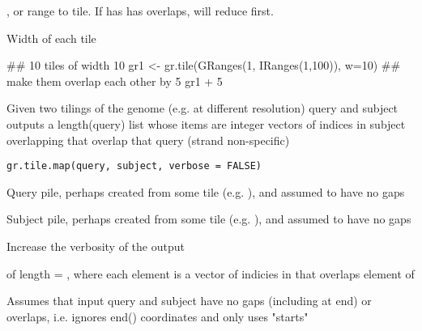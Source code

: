 \documentclass[a4paper]{book}
\begin{document}
%
\begin{Arguments}
\begin{ldescription}
\item[\code{gr}] ,  or  range to tile. If has  has overlaps, will reduce first.

\item[\code{w}] Width of each tile
\end{ldescription}
\end{Arguments}
%
\begin{Examples}
\begin{ExampleCode}
## 10 tiles of width 10
gr1 <- gr.tile(GRanges(1, IRanges(1,100)), w=10)
## make them overlap each other by 5
gr1 + 5
\end{ExampleCode}
\end{Examples}
%
\begin{Description}\relax
Given two tilings of the genome (e.g. at different resolution)
query and subject outputs a length(query) list whose items are integer vectors of indices in subject
overlapping that overlap that query (strand non-specific)
\end{Description}
%
\begin{Usage}
\begin{verbatim}
gr.tile.map(query, subject, verbose = FALSE)
\end{verbatim}
\end{Usage}
%
\begin{Arguments}
\begin{ldescription}
\item[\code{query}] Query  pile, perhaps created from some tile (e.g. ), and assumed to have no gaps

\item[\code{subject}] Subject  pile, perhaps created from some tile (e.g. ), and assumed to have no gaps

\item[\code{verbose}] Increase the verbosity of the output
\end{ldescription}
\end{Arguments}
%
\begin{Value}
 of length = , where each element  is a vector of indicies in  that overlaps element  of 
\end{Value}
%
\begin{Note}\relax
Assumes that input query and subject have no gaps (including at end) or overlaps, i.e. ignores end()
coordinates and only uses "starts"
\end{Note}
\end{document}
